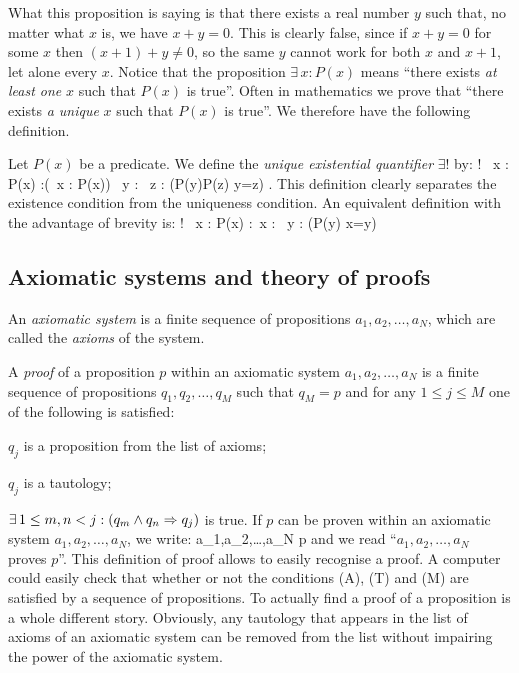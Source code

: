 What this proposition is saying is that there exists a real number $y$ such
that, no matter what $x$ is, we have $x+y=0$. This is clearly false, since if
$x+y=0$ for some $x$ then $(x+1)+y\neq 0$, so the same $y$ cannot work for
both $x$ and $x+1$, let alone every $x$.
\ee
Notice that the proposition $\exists \, x : P(x)$ means ``there exists
\emph{at least one} $x$ such that $P(x)$ is true''. Often in mathematics we
prove that ``there exists \emph{a unique} $x$ such that $P(x)$ is true''. We
therefore have the following definition.

\bd
Let $P(x)$ be a predicate. We define the \emph{unique existential quantifier}
$\exists !$ by:
\bse
\exists ! \, x : P(x) :\eqv (\exists \, x : P(x)) \land \forall \, y : \forall
\, z : (P(y)\land P(z) \imp y=z) .
\ese
\ed
This definition clearly separates the existence condition from the uniqueness
condition. An equivalent definition with the advantage of brevity is:
\bse
\exists ! \, x : P(x) :\eqv \exists \, x : \forall \, y : (P(y) \eqv x=y)
\ese

\subsection{Axiomatic systems and theory of proofs}

\bd
An \emph{axiomatic system} is a finite sequence of propositions
$a_1,a_2,\ldots,a_N$, which are called the \emph{axioms} of the
system.
\ed

\bd
A \emph{proof} of a proposition $p$ within an axiomatic system
$a_1,a_2,\ldots,a_N$ is a finite sequence of propositions $q_1,q_2,\ldots,q_M$
such that $q_M=p$ and for any $1\leq j \leq M$ one of the following is
satisfied:
\ben
\item[(A)] $q_j$ is a proposition from the list of axioms;
\item[(T)] $q_j$ is a tautology;
\item[(M)] $\exists \, 1\leq m,n <j : (q_m\land q_n \Rightarrow q_j)$ is true.
\een
\ed
\br
If $p$ can be proven within an axiomatic system $a_1,a_2,\ldots,a_N$, we
write:
\bse
a_1,a_2,\ldots,a_N \vdash p
\ese
and we read ``$a_1,a_2,\ldots,a_N$ proves $p$''.
\er
\br
This definition of proof allows to easily recognise a proof. A computer could
easily check that whether or not the conditions (A), (T) and (M) are satisfied
by a sequence of propositions. To actually find a proof of a proposition is a
whole different story.
\er
\br
Obviously, any tautology that appears in the list of axioms of an axiomatic
system can be removed from the list without impairing the power of the
axiomatic system.  
\er

